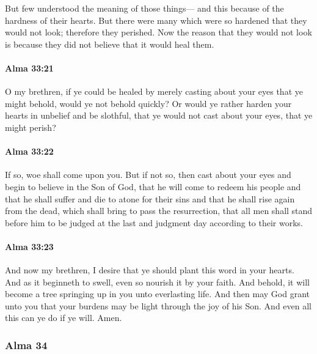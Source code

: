 			But few understood the meaning of those things---
			and this because of the hardness of their hearts.
			But there were many which were so hardened that they would not look;
			therefore they perished.
			Now the reason that they would not look
			is because they did not believe that it would heal them.

		\paragraph{Alma 33:21} %
			\label{ALMA-33-21}

			O my brethren, if ye could be healed
			by merely casting about your eyes that ye might behold,
			would ye not behold quickly?
			Or would ye rather harden your hearts in unbelief and be slothful,
			that ye would not cast about your eyes, that ye might perish?

		\paragraph{Alma 33:22} %
			\label{ALMA-33-22}

			If so, woe shall come upon you.
			But if not so, then cast about your eyes
			and begin to believe in the Son of God,
			that he will come to redeem his people
			and that he shall suffer and die to atone for their sins
			and that he shall rise again from the dead,
			which shall bring to pass the resurrection,
			that all men shall stand before him
			to be judged at the last and judgment day according to their works.

		\paragraph{Alma 33:23} %
			\label{ALMA-33-23}

			And now my brethren, I desire that ye should plant this word in your hearts.
			And as it beginneth to swell, even so nourish it by your faith.
			And behold, it will become a tree springing up in you unto everlasting life.
			And then may God grant unto you
			that your burdens may be light through the joy of his Son.
			And even all this can ye do if ye will.
			Amen.

	\subsubsection{Alma 34} %
		\label{ALMA-34}
		
